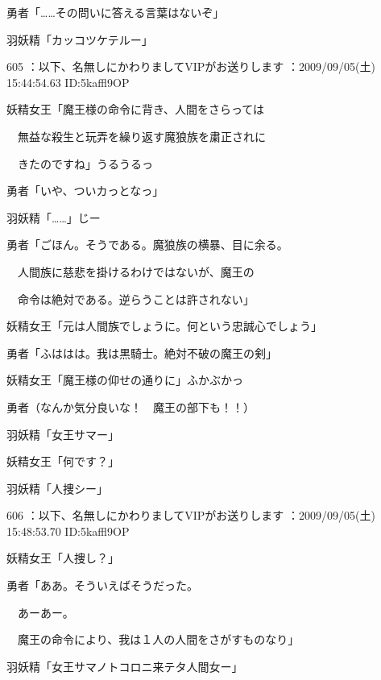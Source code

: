 \documentclass[a4j,twocolumn]{tarticle}
\begin{document}
勇者「……その問いに答える言葉はないぞ」 



羽妖精「カッコツケテルー」 

	
    
    

605 ：以下、名無しにかわりましてVIPがお送りします ：2009/09/05(土) 15:44:54.63 ID:5kaffl9OP 


妖精女王「魔王様の命令に背き、人間をさらっては\par{} 
　無益な殺生と玩弄を繰り返す魔狼族を粛正されに\par{} 
　きたのですね」うるうるっ 



勇者「いや、ついカっとなっ」\par{} 
羽妖精「……」じー 



勇者「ごほん。そうである。魔狼族の横暴、目に余る。\par{} 
　人間族に慈悲を掛けるわけではないが、魔王の\par{} 
　命令は絶対である。逆らうことは許されない」 



妖精女王「元は人間族でしょうに。何という忠誠心でしょう」 



勇者「ふははは。我は黒騎士。絶対不破の魔王の剣」 



妖精女王「魔王様の仰せの通りに」ふかぶかっ 



勇者（なんか気分良いな！　魔王の部下も！！） 



羽妖精「女王サマー」\par{} 
妖精女王「何です？」 



羽妖精「人捜シー」 

	
    
    

606 ：以下、名無しにかわりましてVIPがお送りします ：2009/09/05(土) 15:48:53.70 ID:5kaffl9OP 


妖精女王「人捜し？」 



勇者「ああ。そういえばそうだった。\par{} 
　あーあー。\par{} 
　魔王の命令により、我は１人の人間をさがすものなり」 



羽妖精「女王サマノトコロニ来テタ人間女ー」 
\end{document}
